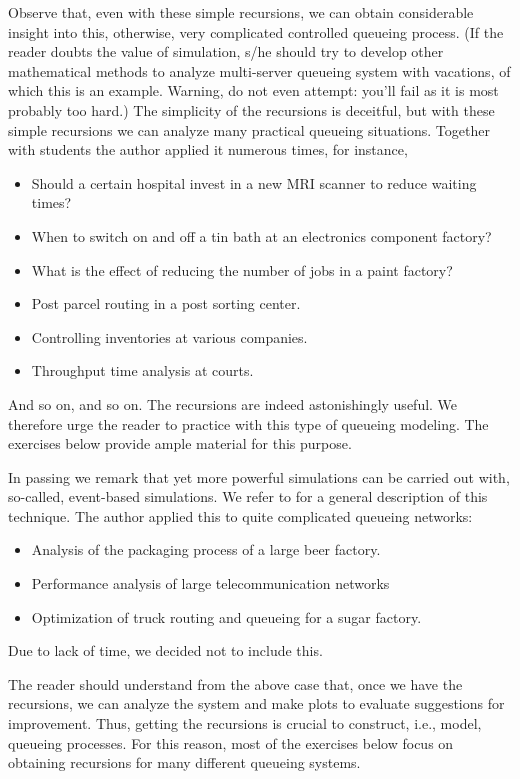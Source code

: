 Observe that, even with these simple recursions, we can obtain
considerable insight into this, otherwise, very complicated controlled
queueing process. (If the reader doubts the value of simulation, s/he
should try to develop other mathematical methods to analyze
multi-server queueing system with vacations, of which this is an
example. Warning, do not even attempt: you'll fail as it is most
probably too hard.) The simplicity of the recursions is deceitful, but
with these simple recursions we can analyze many practical queueing
situations. Together with students the author applied it numerous
times, for instance,
\begin{itemize}
\item Should a certain hospital invest in a new MRI scanner to reduce
  waiting times?
\item When to switch on and off a tin bath at an electronics component factory?
\item What is the effect of reducing the number of jobs in a paint
  factory?
\item Post parcel routing in a post sorting center.
\item Controlling inventories at various companies.
\item Throughput time analysis at courts.
\end{itemize}
And so on, and so on. The recursions are indeed astonishingly useful. We
therefore urge the reader to practice with this type of queueing
modeling. The exercises below provide ample material for this purpose.

In passing we remark that yet more powerful simulations can be carried
out with, so-called, event-based simulations. We refer to
\cite[Section 4.5]{hall91:_queuein_method_servic_manuf} for a general
description of this technique. The author applied this to quite complicated queueing networks:
\begin{itemize}
\item Analysis of the packaging process of a large beer factory.
\item Performance analysis of large telecommunication networks
\item Optimization of truck routing and queueing for a sugar factory.
\end{itemize}
Due to lack of time, we decided not to include this. 

The reader should understand from the above case that, once we have
the recursions, we can analyze the system and make plots to evaluate
suggestions for improvement.  Thus, getting the recursions is crucial
to construct, i.e., model, queueing processes. For this reason, most
of the exercises below focus on obtaining recursions for many
different queueing systems. 

